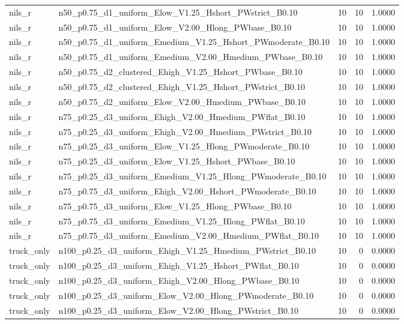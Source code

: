 \begin{tabular}{llrrr}
nils_r & n50_p0.75_d1_uniform_Elow_V1.25_Hshort_PWstrict_B0.10 & 10 & 10 & 1.0000 \\
nils_r & n50_p0.75_d1_uniform_Elow_V2.00_Hlong_PWbase_B0.10 & 10 & 10 & 1.0000 \\
nils_r & n50_p0.75_d1_uniform_Emedium_V1.25_Hshort_PWmoderate_B0.10 & 10 & 10 & 1.0000 \\
nils_r & n50_p0.75_d1_uniform_Emedium_V2.00_Hmedium_PWbase_B0.10 & 10 & 10 & 1.0000 \\
nils_r & n50_p0.75_d2_clustered_Ehigh_V1.25_Hshort_PWbase_B0.10 & 10 & 10 & 1.0000 \\
nils_r & n50_p0.75_d2_clustered_Ehigh_V1.25_Hshort_PWstrict_B0.10 & 10 & 10 & 1.0000 \\
nils_r & n50_p0.75_d2_uniform_Elow_V2.00_Hmedium_PWbase_B0.10 & 10 & 10 & 1.0000 \\
nils_r & n75_p0.25_d3_uniform_Ehigh_V2.00_Hmedium_PWflat_B0.10 & 10 & 10 & 1.0000 \\
nils_r & n75_p0.25_d3_uniform_Ehigh_V2.00_Hmedium_PWstrict_B0.10 & 10 & 10 & 1.0000 \\
nils_r & n75_p0.25_d3_uniform_Elow_V1.25_Hlong_PWmoderate_B0.10 & 10 & 10 & 1.0000 \\
nils_r & n75_p0.25_d3_uniform_Elow_V1.25_Hshort_PWbase_B0.10 & 10 & 10 & 1.0000 \\
nils_r & n75_p0.25_d3_uniform_Emedium_V1.25_Hlong_PWmoderate_B0.10 & 10 & 10 & 1.0000 \\
nils_r & n75_p0.75_d3_uniform_Ehigh_V2.00_Hshort_PWmoderate_B0.10 & 10 & 10 & 1.0000 \\
nils_r & n75_p0.75_d3_uniform_Elow_V1.25_Hlong_PWbase_B0.10 & 10 & 10 & 1.0000 \\
nils_r & n75_p0.75_d3_uniform_Emedium_V1.25_Hlong_PWflat_B0.10 & 10 & 10 & 1.0000 \\
nils_r & n75_p0.75_d3_uniform_Emedium_V2.00_Hmedium_PWflat_B0.10 & 10 & 10 & 1.0000 \\
truck_only & n100_p0.25_d3_uniform_Ehigh_V1.25_Hmedium_PWstrict_B0.10 & 10 & 0 & 0.0000 \\
truck_only & n100_p0.25_d3_uniform_Ehigh_V1.25_Hshort_PWflat_B0.10 & 10 & 0 & 0.0000 \\
truck_only & n100_p0.25_d3_uniform_Ehigh_V2.00_Hlong_PWbase_B0.10 & 10 & 0 & 0.0000 \\
truck_only & n100_p0.25_d3_uniform_Elow_V2.00_Hlong_PWmoderate_B0.10 & 10 & 0 & 0.0000 \\
truck_only & n100_p0.25_d3_uniform_Elow_V2.00_Hlong_PWstrict_B0.10 & 10 & 0 & 0.0000 \\

\end{tabular}
